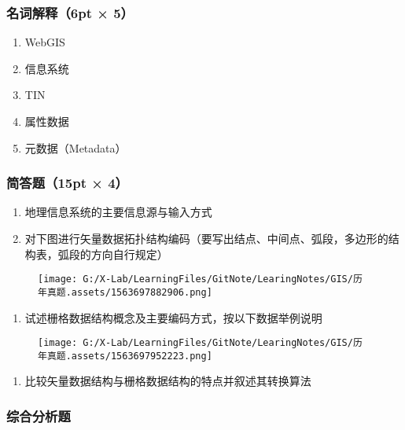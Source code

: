 \documentclass[]{article}
\begin{document}
\hypertarget{header-n220}{%
\subsubsection{名词解释（6pt × 5）}\label{header-n220}}

\begin{enumerate}
\def\labelenumi{\arabic{enumi}.}
\item
  WebGIS
\item
  信息系统
\item
  TIN
\item
  属性数据
\item
  元数据（Metadata）
\end{enumerate}

\hypertarget{header-n232}{%
\subsubsection{简答题（15pt × 4）}\label{header-n232}}

\begin{enumerate}
\def\labelenumi{\arabic{enumi}.}
\item
  地理信息系统的主要信息源与输入方式
\item
  对下图进行矢量数据拓扑结构编码（要写出结点、中间点、弧段，多边形的结构表，弧段的方向自行规定）
\end{enumerate}

\begin{figure}
\centering
\texttt{[image: G:/X-Lab/LearningFiles/GitNote/LearingNotes/GIS/历年真题.assets/1563697882906.png]}
\caption{}
\end{figure}

\begin{enumerate}
\def\labelenumi{\arabic{enumi}.}
\item
  试述栅格数据结构概念及主要编码方式，按以下数据举例说明
\end{enumerate}

\begin{figure}
\centering
\texttt{[image: G:/X-Lab/LearningFiles/GitNote/LearingNotes/GIS/历年真题.assets/1563697952223.png]}
\caption{}
\end{figure}

\begin{enumerate}
\def\labelenumi{\arabic{enumi}.}
\item
  比较矢量数据结构与栅格数据结构的特点并叙述其转换算法
\end{enumerate}

\hypertarget{header-n246}{%
\subsubsection{综合分析题}\label{header-n246}}
\end{document}
